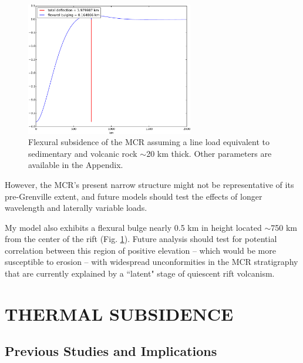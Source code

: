 \documentclass[12pt,letterpaper]{article}
\begin{document}
\begin{figure}
\noindent\includegraphics[width=0.65\textwidth]{figures/flex_fig.pdf}
\caption{\footnotesize{Flexural subsidence of the MCR assuming a line load equivalent to sedimentary and volcanic rock $\sim$20 km thick. Other parameters are available in the Appendix.}}
\label{fig:flex_sub}
\end{figure}

However, the MCR's present narrow structure might not be representative of its pre-Grenville extent, and future models should test the effects of longer wavelength and laterally variable loads.\par

My model also exhibits a flexural bulge nearly 0.5 km in height located $\sim$750 km from the center of the rift (Fig. \ref{fig:flex_sub}). Future analysis should test for potential correlation between this region of positive elevation -- which would be more susceptible to erosion -- with widespread unconformities in the MCR stratigraphy that are currently explained by a ``latent" stage of quiescent rift volcanism.




\section{THERMAL SUBSIDENCE}
\subsection{Previous Studies and Implications}
 
\end{document}
